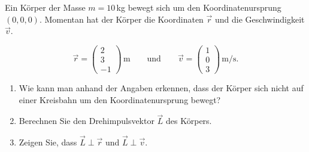\begin{ExerciseBlock}
Ein Körper der Masse $m = 10\,$kg bewegt sich um den Koordinatenursprung $(0,0,0)$. Momentan hat der Körper die Koordinaten $\vec{r}$ und die Geschwindigkeit $\vec{v}$.

\[
  \vec r=\begin{pmatrix}2\\3\\-1\end{pmatrix}\,\unit{\metre}
  \qquad\text{und}\qquad
  \vec v=\begin{pmatrix}1\\0\\3\end{pmatrix}\,\unit{\metre\per\second}.
\]

\begin{enumerate}
	\item Wie kann man anhand der Angaben erkennen, dass der Körper sich nicht auf einer Kreisbahn um den Koordinatenursprung bewegt?

	\item Berechnen Sie den Drehimpulsvektor $\vec{L}$ des Körpers.

	\item Zeigen Sie, dass $\vec{L} \perp \vec{r}$ und $\vec{L} \perp \vec{v}$.

\end{enumerate}
\end{ExerciseBlock}
